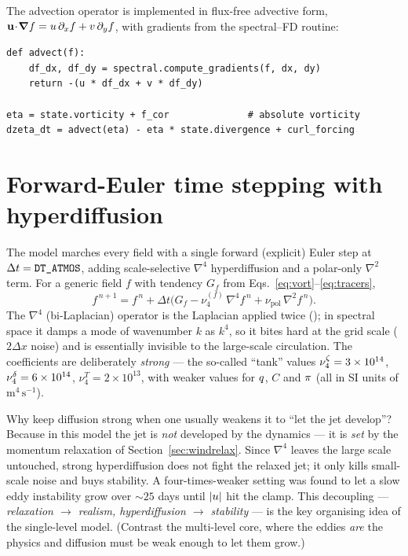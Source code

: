 
The advection operator is implemented in flux-free advective form,
$\mathbf{u}\!\cdot\!\boldsymbol{\nabla} f = u\,\partial_x f + v\,\partial_y f$, with gradients from
the spectral--FD routine:
\begin{lstlisting}[caption={Advection and the vorticity tendency (abbreviated).}]
def advect(f):
    df_dx, df_dy = spectral.compute_gradients(f, dx, dy)
    return -(u * df_dx + v * df_dy)

eta = state.vorticity + f_cor              # absolute vorticity
dzeta_dt = advect(eta) - eta * state.divergence + curl_forcing
\end{lstlisting}

\section{Forward-Euler time stepping with hyperdiffusion}

The model marches every field with a single forward (explicit) Euler step at
$\Delta t = \texttt{DT\_ATMOS}$, adding scale-selective $\nabla^4$ hyperdiffusion and
a polar-only $\nabla^2$ term. For a generic field $f$ with tendency $G_f$ from
Eqs.~\eqref{eq:vort}--\eqref{eq:tracers},
\begin{equation}
  f^{\,n+1} = f^{\,n} + \Delta t\Big(G_f - \nu_4^{(f)}\,\nabla^4 f^{\,n}
              + \nu_{\mathrm{pol}}\,\nabla^2 f^{\,n}\Big).
  \label{eq:euler}
\end{equation}
The $\nabla^4$ (bi-Laplacian) operator is the Laplacian applied twice
(); in spectral
space it damps a mode of wavenumber $k$ as $k^4$, so it bites hard at the grid
scale ($2\Delta x$ noise) and is essentially invisible to the large-scale
circulation. The coefficients are deliberately \emph{strong} --- the so-called
``tank'' values
$\nu_4^{\zeta}=3\times10^{14}$, $\nu_4^{\delta}=6\times10^{14}$,
$\nu_4^{T}=2\times10^{13}$, with weaker values for $q$, $C$ and $\pi$
(all in SI units of $\mathrm{m^4\,s^{-1}}$).

\begin{remark}
Why keep diffusion strong when one usually weakens it to ``let the jet develop''?
Because in this model the jet is \emph{not} developed by the dynamics --- it is
\emph{set} by the momentum relaxation of Section~\ref{sec:windrelax}. Since
$\nabla^4$ leaves the large scale untouched, strong hyperdiffusion does not fight
the relaxed jet; it only kills small-scale noise and buys stability. A
four-times-weaker setting was found to let a slow eddy instability grow over
$\sim 25$ days until $|u|$ hit the clamp. This decoupling ---
\emph{relaxation $\to$ realism, hyperdiffusion $\to$ stability} --- is the key
organising idea of the single-level model. (Contrast the multi-level core, where
the eddies \emph{are} the physics and diffusion must be weak enough to let them
grow.)
\end{remark}

